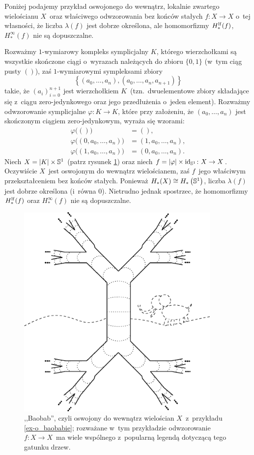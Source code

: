 Poniżej podajemy przykład oswojonego do wewnątrz, lokalnie zwartego wielościanu $X$~oraz właściwego odwzorowania bez końców stałych $f\colon X\to X$ o~tej własności, że liczba $\lambda(f)$ jest dobrze określona, ale homomorfizmy $H^\lf_*(f)$, $H^\infty_*(f)$ nie są dopuszczalne.

\begin{ex}\label{ex-o_baobabie}
Rozważmy $1$-wymiarowy kompleks symplicjalny $K$, którego wierzchołkami są wszystkie skończone ciągi o~wyrazach należących do zbioru $\{0,1\}$ (w~tym ciąg pusty $()$), zaś $1$-wymiarowymi sympleksami zbiory \[\left\{(a_0,\ldots,a_n),(a_0,\ldots,a_n,a_{n+1})\right\}\] takie, że $(a_i)_{i=0}^{n+1}$ jest wierzchołkiem $K$~(tzn.~dwuelementowe zbiory składające się z~ciągu zero-jedynkowego oraz jego przedłużenia o~jeden element). Rozważmy odwzorowanie symplicjalne $\varphi\colon K\to K$, które przy założeniu, że $(a_0,\ldots,a_n)$ jest skończonym ciągiem zero-jedynkowym, wyraża się wzorami: \begin{align*}
\varphi\bigl( () \bigr)&=(),\\\varphi\bigl( (0,a_0,\ldots,a_n)\bigr)&=(1,a_0,\ldots,a_n),\\
\varphi\bigl( (1,a_0,\ldots,a_n)\bigr)&=(0,a_0,\ldots,a_n).\end{align*} 
Niech $X=|K|\times \S^1$ (patrz rysunek \ref{fig-baobab}) oraz niech $f=|\varphi|\times \id_{\S^1}\colon X\to X$. Oczywiście $X$~jest oswojonym do wewnątrz wielościanem, zaś $f$~jego właściwym przekształceniem bez końców stałych. Ponieważ $H_*(X)\cong H_*\left(\S^1\right)$, liczba $\lambda(f)$ jest dobrze określona (i~równa $0$). Nietrudno jednak spostrzec, że homomorfizmy $H^\lf_*(f)$ oraz $H_*^\infty(f)$ nie są dopuszczalne.
\end{ex}

\begin{figure}[h]
\centering
\includegraphics[width=100mm]{img/baobab.eps}
\caption{,,Baobab'', czyli oswojony do wewnątrz wielościan $X$~z~przykładu \ref{ex-o_baobabie}; rozważane w~tym przykładzie odwzorowanie $f\colon X\to X$~ma wiele wspólnego z~popularną legendą dotyczącą tego gatunku drzew.}\label{fig-baobab}
\end{figure}


